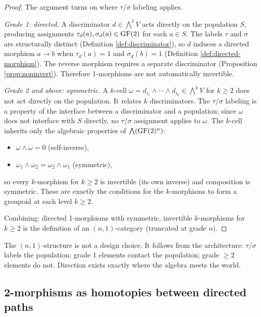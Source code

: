\begin{proof}
The argument turns on where $\tau/\sigma$ labeling applies.

\emph{Grade 1: directed.} A discriminator $d \in \bigwedge^1 V$
acts directly on the population $S$, producing assignments
$\tau_d(a), \sigma_d(a) \in \operatorname{GF}(2)$ for each $a \in S$.
The labels $\tau$ and $\sigma$ are structurally distinct
(Definition \ref{def:discriminator}), so $d$ induces a
directed morphism $a \to b$ when $\tau_d(a) = 1$ and
$\sigma_d(b) = 1$ (Definition \ref{def:directed-morphism}).
The reverse morphism requires a separate discriminator
(Proposition \ref{prop:noninvert}). Therefore 1-morphisms
are not automatically invertible.

\emph{Grade 2 and above: symmetric.}
A $k$-cell $\omega = d_{i_1} \wedge \cdots \wedge d_{i_k}
\in \bigwedge^k V$ for $k \geq 2$ does not act directly
on the population. It relates $k$ discriminators. The
$\tau/\sigma$ labeling is a property of the interface
between a discriminator and a population; since $\omega$
does not interface with $S$ directly, no $\tau/\sigma$
assignment applies to $\omega$. The $k$-cell inherits
only the algebraic properties of $\bigwedge(\operatorname{GF}(2)^n)$:
\begin{itemize}[nosep]
  \item $\omega \wedge \omega = 0$ (self-inverse),
  \item $\omega_1 \wedge \omega_2 = \omega_2 \wedge \omega_1$
    (symmetric),
\end{itemize}
so every $k$-morphism for $k \geq 2$ is invertible (its
own inverse) and composition is symmetric. These are exactly
the conditions for the $k$-morphisms to form a groupoid at
each level $k \geq 2$.

Combining: directed 1-morphisms with symmetric, invertible
$k$-morphisms for $k \geq 2$ is the definition of an
$(n,1)$-category (truncated at grade $n$).
\end{proof}

\begin{remark}
The $(n,1)$-structure is not a design choice. It follows from
the architecture: $\tau/\sigma$ labels the population;
grade 1 elements contact the population; grade $\geq 2$
elements do not. Direction exists exactly where the algebra
meets the world.
\end{remark}

\subsection{2-morphisms as homotopies between directed paths}

